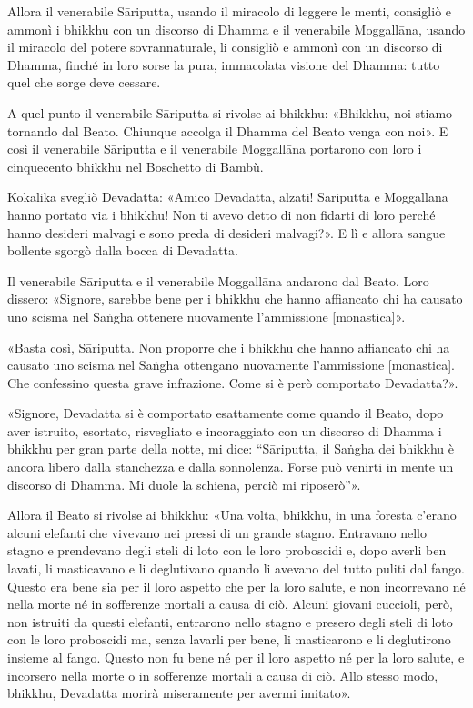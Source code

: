 Allora il venerabile Sāriputta, usando il miracolo di leggere le menti,
consigliò e ammonì i bhikkhu con un discorso di Dhamma e il venerabile
Moggallāna, usando il miracolo del potere sovrannaturale, li consigliò e
ammonì con un discorso di Dhamma, finché in loro sorse la pura,
immacolata visione del Dhamma: tutto quel che sorge deve cessare.


A quel punto il venerabile Sāriputta si rivolse ai bhikkhu: «Bhikkhu,
noi stiamo tornando dal Beato. Chiunque accolga il Dhamma del Beato
venga con noi». E così il venerabile Sāriputta e il venerabile
Moggallāna portarono con loro i cinquecento bhikkhu nel Boschetto di
Bambù.


Kokālika svegliò Devadatta: «Amico Devadatta, alzati! Sāriputta e
Moggallāna hanno portato via i bhikkhu! Non ti avevo detto di non
fidarti di loro perché hanno desideri malvagi e sono preda di desideri
malvagi?». E lì e allora sangue bollente sgorgò dalla bocca di Devadatta.


Il venerabile Sāriputta e il venerabile Moggallāna andarono dal Beato.
Loro dissero: «Signore, sarebbe bene per i bhikkhu che hanno affiancato
chi ha causato uno scisma nel Saṅgha ottenere nuovamente l’ammissione
[monastica]».


«Basta così, Sāriputta. Non proporre che i bhikkhu che hanno affiancato
chi ha causato uno scisma nel Saṅgha ottengano nuovamente l’ammissione
[monastica]. Che confessino questa grave infrazione. Come si è però
comportato Devadatta?».


«Signore, Devadatta si è comportato esattamente come quando il Beato,
dopo aver istruito, esortato, risvegliato e incoraggiato con un discorso
di Dhamma i bhikkhu per gran parte della notte, mi dice: “Sāriputta, il
Saṅgha dei bhikkhu è ancora libero dalla stanchezza e dalla sonnolenza.
Forse può venirti in mente un discorso di Dhamma. Mi duole la schiena,
perciò mi riposerò”».


Allora il Beato si rivolse ai bhikkhu: «Una volta, bhikkhu, in una
foresta c’erano alcuni elefanti che vivevano nei pressi di un grande
stagno. Entravano nello stagno e prendevano degli steli di loto con le
loro proboscidi e, dopo averli ben lavati, li masticavano e li
deglutivano quando li avevano del tutto puliti dal fango. Questo era
bene sia per il loro aspetto che per la loro salute, e non incorrevano
né nella morte né in sofferenze mortali a causa di ciò. Alcuni giovani
cuccioli, però, non istruiti da questi elefanti, entrarono nello stagno
e presero degli steli di loto con le loro proboscidi ma, senza lavarli
per bene, li masticarono e li deglutirono insieme al fango. Questo non
fu bene né per il loro aspetto né per la loro salute, e incorsero nella
morte o in sofferenze mortali a causa di ciò. Allo stesso modo, bhikkhu,
Devadatta morirà miseramente per avermi imitato».


